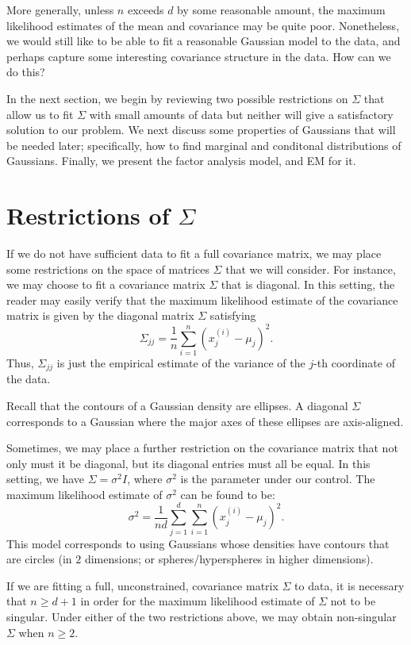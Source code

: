More generally, unless $n$ exceeds $d$ by some reasonable amount, the maximum likelihood estimates of the mean and covariance may be quite poor.
Nonetheless, we would still like to be able to fit a reasonable Gaussian model
to the data, and perhaps capture some interesting covariance structure in
the data. How can we do this?

In the next section, we begin by reviewing two possible restrictions on
$\Sigma$ that allow us to fit $\Sigma$ with small amounts of data but neither will give
a satisfactory solution to our problem. We next discuss some properties of
Gaussians that will be needed later; specifically, how to find marginal and
conditonal distributions of Gaussians. Finally, we present the factor analysis
model, and EM for it.

\section{Restrictions of $\Sigma$}
If we do not have sufficient data to fit a full covariance matrix, we may
place some restrictions on the space of matrices $\Sigma$ that we will consider. For
instance, we may choose to fit a covariance matrix $\Sigma$ that is diagonal. In this
setting, the reader may easily verify that the maximum likelihood estimate
of the covariance matrix is given by the diagonal matrix $\Sigma$ satisfying
\[
\Sigma_{jj} =
\frac 1 n \sum^n_{i=1} (x^{(i)}_j - \mu_j)^2.
\]
Thus, $\Sigma_{jj}$ is just the empirical estimate of the variance of the $j$-th coordinate
of the data.

Recall that the contours of a Gaussian density are ellipses. A diagonal
$\Sigma$ corresponds to a Gaussian where the major axes of these ellipses are axis-aligned.

Sometimes, we may place a further restriction on the covariance matrix
that not only must it be diagonal, but its diagonal entries must all be equal.
In this setting, we have $\Sigma = \sigma^2 I$, where $\sigma^2$
is the parameter under our control.
The maximum likelihood estimate of $\sigma^2$ can be found to be:
\[
    \sigma^2 = \frac{1}{nd} \sum^d_{j=1}\sum^n_{i=1}(x^{(i)}_j - \mu_j)^2.
\]
This model corresponds to using Gaussians whose densities have contours
that are circles (in $2$ dimensions; or spheres/hyperspheres in higher dimensions).

If we are fitting a full, unconstrained, covariance matrix $\Sigma$ to data, it is
necessary that $n \ge d + 1$ in order for the maximum likelihood estimate of $\Sigma$
not to be singular. Under either of the two restrictions above, we may obtain
non-singular $\Sigma$ when $n \ge 2$.

